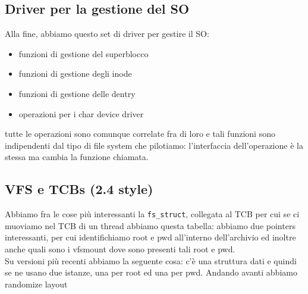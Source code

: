\documentclass[12pt, oneside]{extbook}
\begin{document}
\subsection{Driver per la gestione del SO}
Alla fine, abbiamo questo set di driver per gestire il SO:
\begin{itemize}
\item funzioni di gestione del superblocco
\item funzioni di gestione degli inode
\item funzioni di gestione delle dentry
\item operazioni per i char device driver
\end{itemize}
tutte le operazioni sono comunque correlate fra di loro e tali funzioni sono indipendenti dal tipo di file system che pilotiamo: l'interfaccia dell'operazione è la stessa ma cambia la funzione chiamata.
\subsection{VFS e TCBs (2.4 style)}
Abbiamo fra le cose più interessanti la \texttt{fs\_struct}, collegata al TCB per cui se ci muoviamo nel TCB di un thread abbiamo questa tabella:
abbiamo due pointers interessanti, per cui identifichiamo root e pwd all'interno dell'archivio ed inoltre anche quali sono i vfsmount dove sono presenti tali root e pwd.\\Su versioni più recenti abbiamo la seguente cosa:
c'è una struttura dati e quindi se ne usano due istanze, una per root ed una per pwd. Andando avanti abbiamo randomize layout
\end{document}
